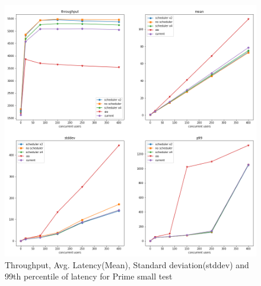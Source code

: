 \begin{figure}[htbp]
	\begin{center}
		\includegraphics[scale=0.5]{figures/prime_small test results.png}
	\end{center}
	\caption{Throughput, Avg. Latency(Mean), Standard deviation(stddev) and 99th percentile of latency for Prime small test }
	\label{phase-1-prime-small-all-architectures}
\end{figure}

